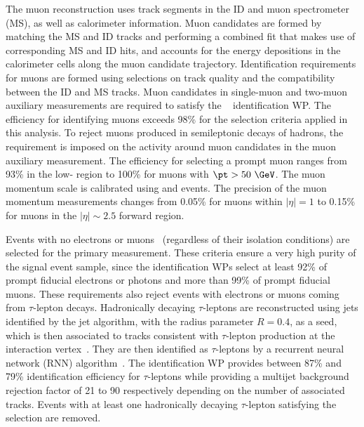 \documentclass[atlasdraft=false, cernpreprint, UKenglish, texmf, orcidlogo]{atlasdoc}
\begin{document}
The muon reconstruction uses track segments in the ID and muon spectrometer (MS), as well as calorimeter information.
Muon candidates are formed by matching the MS and ID tracks and performing a combined fit that makes use of corresponding MS and ID hits,
and accounts for the energy depositions in the calorimeter cells along the muon candidate trajectory.
Identification requirements for muons are formed using selections on track quality and the compatibility between the ID and MS tracks.
Muon candidates in single-muon and two-muon auxiliary measurements are required to satisfy the \mediumID~\cite{MUON-2018-03} identification WP\@.
The  efficiency for identifying \mediumID muons exceeds 98\% for the selection criteria applied in this analysis.
To reject muons produced in semileptonic decays of hadrons, the ~\cite{PERF-2015-10}
requirement is imposed on the activity around muon candidates in the muon auxiliary measurement.
The   efficiency for selecting a prompt muon ranges from 93\% in the low-\pt{} region to 100\% for
muons with \(\pt>50~\GeV\).
The muon momentum scale is calibrated  using \JPmm and \Zmumu events.  The precision of the muon momentum measurements
changes from 0.05\% for muons within $|\eta|=1$ to 0.15\% for muons in the $|\eta|\sim 2.5$ forward region.
 
Events with no \looseID electrons or muons~\cite{EGAM-2018-01,MUON-2018-03} (regardless of their isolation conditions) are selected for the primary \ptmiss  measurement.
These criteria ensure a very high purity of the signal event sample, since the \looseID identification WPs select at least 92\% of
prompt fiducial electrons or photons and more than 99\% of prompt fiducial muons.
These requirements also reject events with electrons or muons coming from $\tau$-lepton decays.
Hadronically decaying $\tau$-leptons are reconstructed using jets identified by the \antikt jet algorithm, with the radius parameter \(R=0.4\), as a seed, which is then
associated to tracks consistent with $\tau$-lepton production at the interaction vertex~\cite{ATL-PHYS-PUB-2015-045}.
They are then identified as $\tau$-leptons by a recurrent neural network (RNN) algorithm~\cite{ATL-PHYS-PUB-2019-033}.
The \looseID identification WP provides between 87\% and 79\% identification efficiency for $\tau$-leptons while providing a multijet background rejection factor of 21 to 90 respectively depending on the number of associated tracks.
Events with at least one hadronically decaying $\tau$-lepton satisfying the \looseID selection are removed.
 
\end{document}
